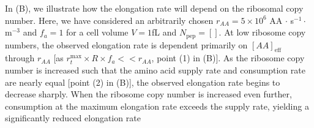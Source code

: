 In (B), we illustrate how the elongation rate will depend
on the ribosomal copy number. Here, we have considered
an arbitrarily chosen $r_{AA} = 5\times 10^6$ AA $\cdot$ s$^{-1} \cdot$ \textmu
m$^{-3}$ and $f_a = 1$ for a cell volume $V = 1$fL and $N_\text{pep}
= []$. At low ribosome copy numbers, the observed elongation rate is dependent
primarily on $[AA]_\text{eff}$ through $r_{AA}$ [as $r_t^{\text{max}} \times R
\times f_a << r_{AA}$, point (1) in (B)]. As the
ribosome copy number is increased such that the amino acid supply rate and
consumption rate are nearly equal [point (2) in (B)],
the observed elongation rate begins to decrease sharply. When the ribosome copy
number is increased even further, consumption at the maximum elongation rate
exceeds the supply rate, yielding a significantly reduced elongation rate
